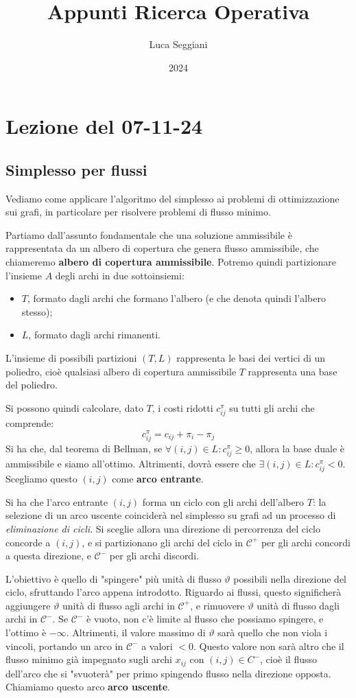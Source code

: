 \documentclass[a4paper,11pt]{article}
\title{Appunti Ricerca Operativa}
\author{Luca Seggiani}
\date{2024}
\begin{document}
\section{Lezione del 07-11-24}

\thispagestyle{empty}
\pagestyle{fancy}

\subsection{Simplesso per flussi}
Vediamo come applicare l'algoritmo del simplesso ai problemi di ottimizzazione sui grafi, in particolare per risolvere problemi di flusso minimo. 

Partiamo dall'assunto fondamentale che una soluzione ammissibile è rappresentata da un albero di copertura che genera flusso ammissibile, che chiameremo \textbf{albero di copertura ammissibile}.
Potremo quindi partizionare l'insieme $A$ degli archi in due sottoinsiemi:
\begin{itemize}
	\item $T$, formato dagli archi che formano l'albero (e che denota quindi l'albero stesso);
	\item $L$, formato dagli archi rimanenti.
\end{itemize}

L'insieme di possibili partizioni $(T, L)$ rappresenta le basi dei vertici di un poliedro, cioè qualsiasi albero di copertura ammissibile $T$ rappresenta una base del poliedro.

Si possono quindi calcolare, dato $T$, i costi ridotti $c_{ij}^\pi$ su tutti gli archi che comprende:
$$
c_{ij}^\pi = c_{ij} + \pi_i - \pi_j
$$
Si ha che, dal teorema di Bellman, se $\forall (i, j) \in L : c_{ij}^\pi \geq 0$, allora la base duale è ammissibile e siamo all'ottimo.
Altrimenti, dovrà essere che $\exists (i,j) \in L : c_{ij}^\pi < 0$. Scegliamo questo $(i, j)$ come \textbf{arco entrante}.

Si ha che l'arco entrante $(i, j)$ forma un ciclo con gli archi dell'albero $T$: la selezione di un arco uscente coinciderà nel simplesso su grafi ad un processo di \textit{eliminazione di cicli}.
Si sceglie allora una direzione di percorrenza del ciclo concorde a $(i, j)$, e si partizionano gli archi del ciclo in $\mathcal{C}^+$ per gli archi concordi a questa direzione, e $\mathcal{C}^-$ per gli archi discordi.

L'obiettivo è quello di "spingere" più unità di flusso $\vartheta$ possibili nella direzione del ciclo, sfruttando l'arco appena introdotto.
Riguardo ai flussi, questo significherà aggiungere $\vartheta$ unità di flusso agli archi in $\mathcal{C}^+$, e rimuovere $\vartheta$ unità di flusso dagli archi in $\mathcal{C}^-$.
Se $\mathcal{C}^-$ è vuoto, non c'è limite al flusso che possiamo spingere, e l'ottimo è $-\infty$. 
Altrimenti, il valore massimo di $\vartheta$ sarà quello che non viola i vincoli, portando un arco in $\mathcal{C}^-$ a valori $<0$. 
Questo valore non sarà altro che il flusso minimo già impegnato sugli archi $x_{ij}$ con $(i, j) \in C^-$, cioè il flusso dell'arco che si "svuoterà" per primo spingendo flusso nella direzione opposta.
Chiamiamo questo arco \textbf{arco uscente}.
\end{document}

